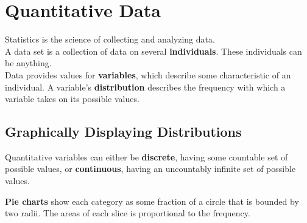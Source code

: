 \documentclass[../AP_Statistics.tex]{subfiles}
\begin{document}
	\chapter{Quantitative Data}
		Statistics is the science of collecting and analyzing data. \\
		A data set is a collection of data on several \textbf{individuals}. These individuals can be anything. \\
		Data provides values for \textbf{variables}, which describe some characteristic of an individual.
		A variable's \textbf{distribution} describes the frequency with which a variable takes on its possible values.
		\section{Graphically Displaying Distributions}
			Quantitative variables can either be \textbf{discrete}, having some countable set of possible values, or \textbf{continuous}, having an uncountably infinite set of possible values. \\
			\begin{center}
				\end{center}
				\textbf{Pie charts} show each category as some fraction of a circle that is bounded by two radii. The areas of each slice is proportional to the frequency.
\end{document}
